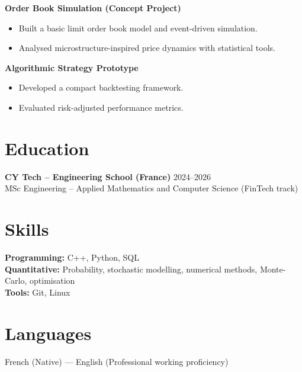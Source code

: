 \documentclass[10pt, letterpaper]{article}
\begin{document}
\textbf{Order Book Simulation (Concept Project)}
\begin{itemize}[leftmargin=0.5cm]
\item Built a basic limit order book model and event-driven simulation.
\item Analysed microstructure-inspired price dynamics with statistical tools.
\end{itemize}

\textbf{Algorithmic Strategy Prototype}
\begin{itemize}[leftmargin=0.5cm]
\item Developed a compact backtesting framework.
\item Evaluated risk-adjusted performance metrics.
\end{itemize}

\section*{Education}
\textbf{CY Tech -- Engineering School (France)} \hfill 2024--2026\\
MSc Engineering -- Applied Mathematics and Computer Science (FinTech track)

\section*{Skills}
\textbf{Programming:} C++, Python, SQL\\
\textbf{Quantitative:} Probability, stochastic modelling, numerical methods, Monte-Carlo, optimisation\\
\textbf{Tools:} Git, Linux

\section*{Languages}
French (Native) --- English (Professional working proficiency)
\end{document}

